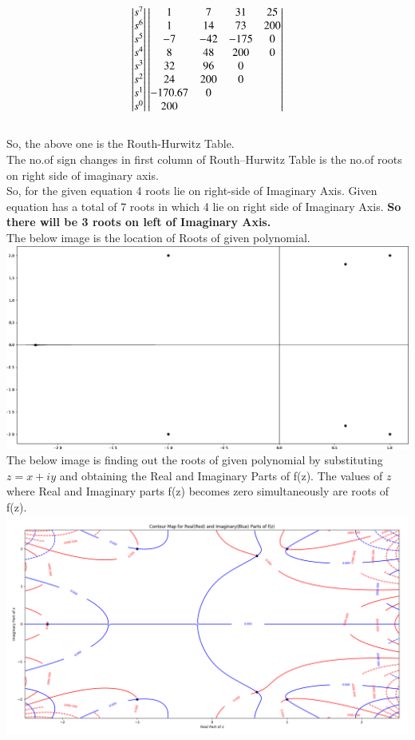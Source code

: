 \begin{align}
\begin{vmatrix}s^7\\s^6\\s^5\\s^4\\s^3\\s^2\\s^1\\s^0\end{vmatrix}
\begin{vmatrix}1 & 7 & 31 & 25 \\ 1 & 14 & 73 & 200 \\ -7 & -42 & -175 & 0 \\ 8 & 48 & 200 & 0 \\ 32 & 96 & 0 &  \\ 24 & 200 & 0 &  \\ -170.67 & 0 &  & \\200 &   &   & \end{vmatrix}
\end{align}\\

So, the above one is the Routh-Hurwitz Table.\\
The no.of sign changes in first column of Routh–Hurwitz Table is the no.of roots on right side of imaginary axis.\\
So, for the given equation 4 roots lie on right-side of Imaginary Axis.
Given equation has a total of 7 roots in which 4 lie on right side of Imaginary Axis. \textbf{So there will be 3 roots on left of Imaginary Axis.}\\

The below image is the location of Roots of given polynomial.\\
\includegraphics[scale=0.15]{figs/Roots.eps}\\

The below image is finding out the roots of given polynomial by substituting $z=x+iy$ and obtaining the Real and Imaginary Parts of f(z). The values of $z$ where Real and Imaginary parts f(z) becomes zero simultaneously are roots of f(z).\\
\includegraphics[scale=0.15]{figs/f(z).png}

